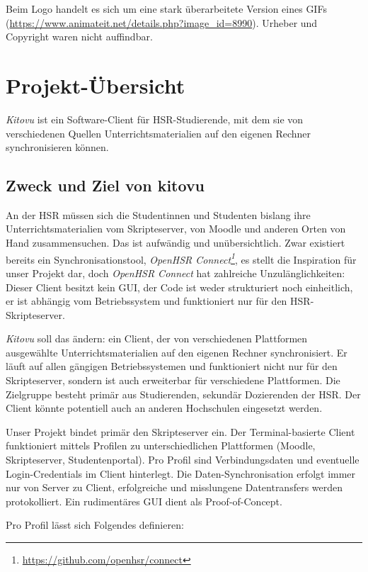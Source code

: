 \documentclass[a4paper]{article}
\let\oldsection\section
\renewcommand\section{\clearpage\oldsection}
\newcommand{\tool}[2]{\emph{#1\footnote{\url{#2}}}}
\begin{document}
Beim Logo handelt es sich um eine stark überarbeitete Version eines GIFs (\url{https://www.animateit.net/details.php?image_id=8990}). Urheber und Copyright waren nicht auffindbar.

\section{Projekt-Übersicht}
\emph{Kitovu} ist ein Software-Client für HSR-Studierende, mit dem sie von verschiedenen Quellen Unterrichtsmaterialien auf den eigenen Rechner synchronisieren können.

\subsection{Zweck und Ziel von kitovu}
An der HSR müssen sich die Studentinnen und Studenten bislang ihre Unterrichtsmaterialien vom Skripteserver, von Moodle und anderen Orten von Hand zusammensuchen. Das ist aufwändig und unübersichtlich. Zwar existiert bereits ein Synchronisationstool, \tool{OpenHSR Connect}{https://github.com/openhsr/connect}, es stellt die Inspiration für unser Projekt dar, doch \emph{OpenHSR Connect} hat zahlreiche Unzulänglichkeiten: Dieser Client besitzt kein GUI, der Code ist weder strukturiert noch einheitlich, er ist abhängig vom Betriebssystem und funktioniert nur für den HSR-Skripteserver.

\emph{Kitovu} soll das ändern: ein Client, der von verschiedenen Plattformen ausgewählte Unterrichtsmaterialien auf den eigenen Rechner synchronisiert. Er läuft auf allen gängigen Betriebssystemen und funktioniert nicht nur für den Skripteserver, sondern ist auch erweiterbar für verschiedene Plattformen. Die Zielgruppe besteht primär aus Studierenden, sekundär Dozierenden der HSR. Der Client könnte potentiell auch an anderen Hochschulen eingesetzt werden.

Unser Projekt bindet primär den Skripteserver ein. Der Terminal-basierte Client funktioniert mittels Profilen zu unterschiedlichen Plattformen (Moodle, Skripteserver, Studentenportal). Pro Profil sind Verbindungsdaten und eventuelle Login-Credentials im Client hinterlegt. Die Daten-Synchronisation erfolgt immer nur von Server zu Client, erfolgreiche und misslungene Datentransfers werden protokolliert. Ein rudimentäres GUI dient als Proof-of-Concept.

Pro Profil lässt sich Folgendes definieren:
\end{document}
